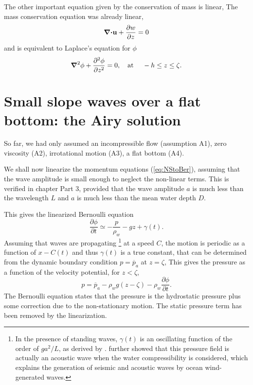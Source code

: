 The other important equation given by the conservation of mass is linear, 
The mass conservation equation was already linear, 
\begin{equation}
\mbox{\boldmath $\nabla$} \mbox{\boldmath $\cdot$} {\mathbf u} + \frac{\partial w}{\partial z} =0
\end{equation}
and is equivalent to Laplace's equation for $\phi$
\begin{equation}
    \mbox{\boldmath $\nabla$}^2 \phi + \frac{\partial^2 \phi}{\partial z^2}=0,
    \quad \mbox{at\ }\quad -h\leq z \leq \zeta. \label{Laplace}
\end{equation}


\section{Small slope waves over a flat bottom: the Airy solution}
So far, we had only assumed an incompressible flow (assumption A1), zero viscosity (A2), 
irrotational motion (A3), a flat bottom (A4). 


We shall now linearize the momentum equations (\ref{eq:NStoBer}), assuming that the wave amplitude is small enough to 
neglect the non-linear terms. This is verified in chapter Part 3, provided that 
the wave amplitude $a$ is much less than the wavelength $L$ and $a$ is much less than the mean water depth $D$. 


This gives the linearized Bernoulli equation
\begin{equation}
    \frac{\partial \phi}{\partial t} \simeq 
       -\frac{p}{\rho_w}-g z + \gamma(t).\label{Bernoulli_lin}
\end{equation}
Assuming that waves are propagating \footnote{In the presence of standing waves, $\gamma(t)$ 
is an oscillating function of the order of $g a^2/L$, as derived by \cite{Miche1944d}.  \cite{Longuet-Higgins1950} further showed that this pressure field is actually an acoustic wave when the water compressibility is considered, which explains the generation of seismic and acoustic waves by ocean wind-generated waves.} at a speed $C$, the motion is periodic as a function of $x-C(t)$ and thus $\gamma(t)$ is a true constant, that can be determined from the dynamic boundary condition $p=\overline{p}_a$ at $z=\zeta$,
This gives the pressure as a function of the velocity potential, for $z< \zeta$, 
\begin{equation}
    p=\overline{p}_a -{\rho_w}g(z-\zeta) 
    -\rho_w \frac{\partial \phi}{\partial t}.\label{p_all}
\end{equation}
The Bernoulli equation states that the pressure is the hydrostatic pressure plus some correction 
due to the non-stationary motion. The static pressure term has been removed by the linearization. 


